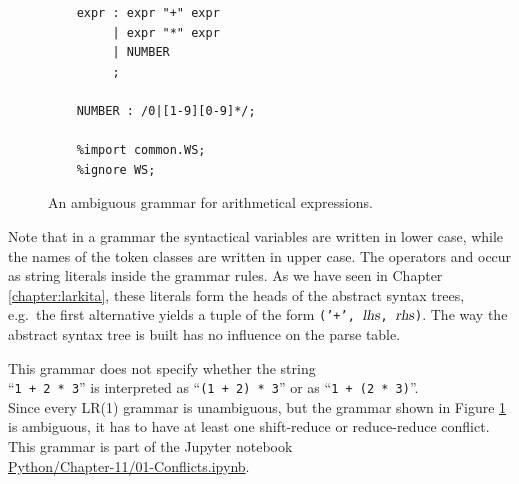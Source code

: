 \begin{figure}[!ht]
\centering
\begin{verbatim}
    expr : expr "+" expr
         | expr "*" expr
         | NUMBER
         ;

    NUMBER : /0|[1-9][0-9]*/;

    %import common.WS;
    %ignore WS;
\end{verbatim}
\vspace*{-0.3cm}
\caption{An ambiguous grammar for arithmetical expressions.}
\label{fig:Conflicts.ipynb}
\end{figure}
\FloatBarrier

\noindent
Note that in a  grammar the syntactical variables are written in lower case, while the names of
the token classes are written in upper case.  The operators \squoted{+} and \squoted{*} occur as string literals
inside the grammar rules.  As we have seen in Chapter \ref{chapter:larkita}, these literals form the heads of the
abstract syntax trees, e.g.~the first alternative yields a tuple of the form \texttt{('+', $\textsl{lhs}$,
$\textsl{rhs}$)}.  The way the abstract syntax tree is built has no influence on the parse table.

This grammar does not specify whether the string
\\[0.2cm]
\hspace*{1.3cm}
``\texttt{1 + 2 * 3}'' \quad is interpreted as \quad  ``\texttt{(1 + 2) * 3}'' \quad or as \quad ``\texttt{1 +
  (2 * 3)}''.
\\[0.2cm]
Since every LR(1) grammar is unambiguous, but the grammar shown in Figure \ref{fig:Conflicts.ipynb} is
ambiguous, it has to have at least one shift-reduce or reduce-reduce conflict.  This grammar is part of the
Jupyter notebook
\\[0.2cm]
\hspace*{1.3cm}
\href{https://github.com/karlstroetmann/Formal-Languages/blob/master/Python/Chapter-11/01-Conflicts.ipynb}{Python/Chapter-11/01-Conflicts.ipynb}.
\\[0.2cm]

